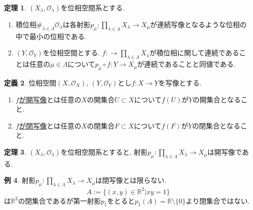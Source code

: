 \documentclass[dvipdfmx,a4paper,11pt]{article}
\newcommand{\R}{\mathbb{R}}
\theoremstyle{definition}
\newtheorem{thm}{定理}
\newtheorem{dfn}[thm]{定義}
\newtheorem{exa}[thm]{例}
\begin{document}
  \begin{tcolorbox}[
    colback = white,
    colframe = green!35!black,
    fonttitle = \bfseries,
    breakable = true]
    \begin{thm}
$(X_{\lambda},\mathscr{O}_{\lambda} )$を位相空間系とする.

\begin{enumerate}
 \setlength{\parskip}{0cm} 
  \setlength{\itemsep}{0cm} 
\item 積位相$\#_{\lambda \in \Lambda}\mathscr{O}_{\lambda} $は各射影$p_\mu : \prod_{\lambda \in \Lambda}X_{\lambda}\rightarrow X_{\mu} $が連続写像となるような位相の中で最小の位相である.
\item $(Y, \mathscr{O}_Y)$を位相空間とする. $f : \rightarrow \prod_{\lambda \in \Lambda}X_{\lambda}$が積位相に関して連続であることは任意の$\mu \in \Lambda$について$p_{\mu} \circ f : Y \rightarrow X_{\mu}$が連続であることと同値である.
\end{enumerate}
  \end{thm}
 \end{tcolorbox}

\begin{tcolorbox}[
    colback = white,
    colframe = green!35!black,
    fonttitle = \bfseries,
    breakable = true]
    \begin{dfn}
位相空間$(X, \mathscr{O}_X )$, $(Y, \mathscr{O}_Y)$とし$f : X \rightarrow Y$を写像とする.
\begin{enumerate}
\item \underline{$f$が開写像}とは任意の$X$の開集合$U \subset X$について$f(U)$が$Y$の開集合となること.
\item\underline{$f$が閉写像}とは任意の$X$の閉集合$F\subset X$について$f(F)$が$Y$の閉集合となること.
\end{enumerate}

  \end{dfn}
 \end{tcolorbox}
 
   \begin{tcolorbox}[
    colback = white,
    colframe = green!35!black,
    fonttitle = \bfseries,
    breakable = true]
    \begin{thm}
$(X_{\lambda},\mathscr{O}_{\lambda} )$を位相空間系とすると, 射影$p_\mu : \prod_{\lambda \in \Lambda}X_{\lambda}\rightarrow X_{\mu} $は開写像である.
  \end{thm}
 \end{tcolorbox}
 \begin{exa}
 射影$p_\mu : \prod_{\lambda \in \Lambda}X_{\lambda}\rightarrow X_{\mu} $は閉写像とは限らない.
 $$
 A := \{ (x,y) \in \R^2 | xy=1\}
 $$
 は$\R^2$の閉集合であるが第一射影$p_1$をとると$p_1(A) = \R \setminus \{0\}$より閉集合ではない.
 \end{exa}
\end{document}
